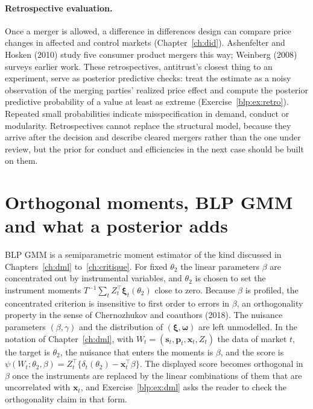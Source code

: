 \paragraph{Retrospective evaluation.} Once a merger is allowed, a difference in differences design can compare price changes in affected and control markets (Chapter~\ref{ch:did}). Ashenfelter and Hosken (2010) study five consumer product mergers this way; Weinberg (2008) surveys earlier work. These retrospectives, antitrust's closest thing to an experiment, serve as posterior predictive checks: treat the estimate as a noisy observation of the merging parties' realized price effect and compute the posterior predictive probability of a value at least as extreme (Exercise~\ref{blp:ex:retro}). Repeated small probabilities indicate misspecification in demand, conduct or modularity. Retrospectives cannot replace the structural model, because they arrive after the decision and describe cleared mergers rather than the one under review, but the prior for conduct and efficiencies in the next case should be built on them.

\section[Orthogonal moments and BLP GMM]{Orthogonal moments, BLP GMM and what a posterior adds}\label{blp:sec:dml}

BLP GMM is a semiparametric moment estimator of the kind discussed in Chapters~\ref{ch:dml} to~\ref{ch:critique}. For fixed $\theta_2$ the linear parameters $\beta$ are concentrated out by
instrumental variables, and $\theta_2$ is chosen to set the instrument moments
$T^{-1}\sum_t Z_t^\top\bm\xi_t(\theta_2)$ close to zero. Because $\beta$ is profiled, the
concentrated criterion is insensitive to first order to errors in $\beta$, an orthogonality
property in the sense of Chernozhukov and coauthors (2018). The nuisance parameters $(\beta,\gamma)$ and
the distribution of $(\bm\xi,\bm\omega)$ are left unmodelled. In the notation of Chapter~\ref{ch:dml}, with $W_t = (\bm s_t,\bm p_t,\bm x_t,Z_t)$ the data of market $t$, the target is $\theta_2$, the nuisance that enters the moments is $\beta$, and the score is $\psi(W_t;\theta_2,\beta) = Z_t^\top\{\delta_t(\theta_2)-\bm x_t^\top\beta\}$. The displayed score becomes orthogonal in $\beta$ once the instruments are replaced by the linear combinations of them that are uncorrelated with $\bm x_t$, and Exercise~\ref{blp:ex:dml} asks the reader to check the orthogonality claim in that form.

